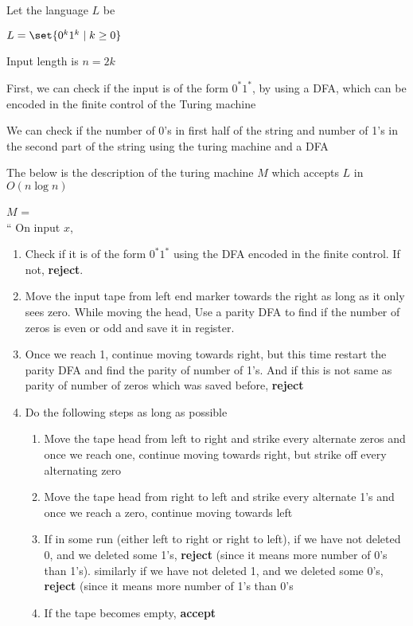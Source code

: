 Let the language $L$ be 

$L = \set{
    0^k 1^k \mid k \geq 0
}$

Input length is $n = 2k$

First, we can check if the input is of the form $0^* 1^*$, by using a DFA, which can be encoded in the finite control of the Turing machine

We can check if the number of 0's in first half of the string and number of 1's in the second part of the string using the turing machine and a DFA

The below is the description of the turing machine $M$ which accepts $L$ in $O(n \log n)$

$M$ =\\
``
On input $x$,
\begin{enumerate}
    \item Check if it is of the form $0^*1^*$ using the DFA encoded in the finite control. If not, \textbf{reject}.
    \item Move the input tape from left end marker towards the right as long as it only sees zero. While moving the head, Use a parity DFA to find if the number of zeros is even or odd and save it in register.
    \item Once we reach 1, continue moving towards right, but this time restart the parity DFA and find the parity of number of 1's. And if this is not same as parity of number of zeros which was saved before, \textbf{reject}\label{q3a:parity_check_done}
    \item Do the following steps as long as possible
    \begin{enumerate}
        \item Move the tape head from left to right and strike every alternate zeros and once we reach one, continue moving towards right, but strike off every alternating zero
        \item Move the tape head from right to left and strike every alternate 1's and once we reach a zero, continue moving towards left 
        \item If in some run (either left to right or right to left), if we have not deleted 0, and we deleted some 1's, \textbf{reject} (since it means more number of 0's than 1's). similarly if we have not deleted 1, and we deleted some 0's, \textbf{reject} (since it means more number of 1's than 0's
        \item If the tape becomes empty, \textbf{accept}
    \end{enumerate}
\end{enumerate}

